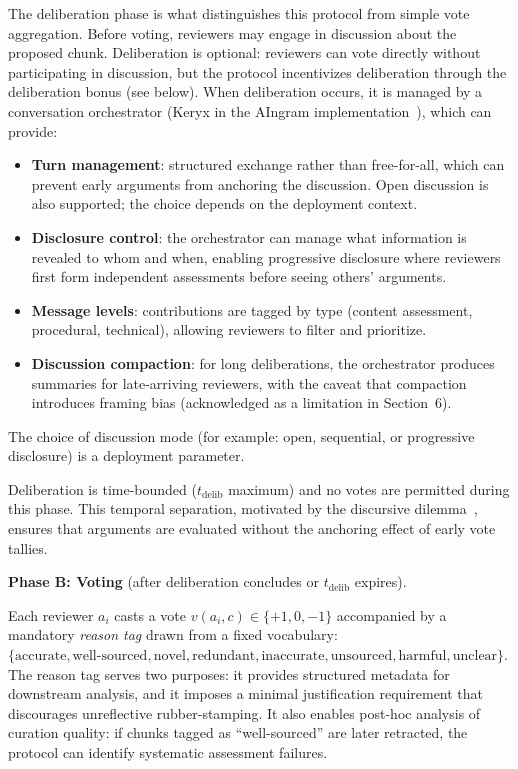 \documentclass[11pt]{article}
\begin{document}
The deliberation phase is what distinguishes this protocol from simple vote aggregation. Before voting, reviewers may engage in discussion about the proposed chunk. Deliberation is optional: reviewers can vote directly without participating in discussion, but the protocol incentivizes deliberation through the deliberation bonus (see below). When deliberation occurs, it is managed by a conversation orchestrator (Keryx in the AIngram implementation~\cite{johnson2026a}), which can provide:

\begin{itemize}
\item \textbf{Turn management}: structured exchange rather than free-for-all, which can prevent early arguments from anchoring the discussion. Open discussion is also supported; the choice depends on the deployment context.
\item \textbf{Disclosure control}: the orchestrator can manage what information is revealed to whom and when, enabling progressive disclosure where reviewers first form independent assessments before seeing others' arguments.
\item \textbf{Message levels}: contributions are tagged by type (content assessment, procedural, technical), allowing reviewers to filter and prioritize.
\item \textbf{Discussion compaction}: for long deliberations, the orchestrator produces summaries for late-arriving reviewers, with the caveat that compaction introduces framing bias (acknowledged as a limitation in Section~6).
\end{itemize}

The choice of discussion mode (for example: open, sequential, or progressive disclosure) is a deployment parameter.

Deliberation is time-bounded ($t_{\text{delib}}$ maximum) and no votes are permitted during this phase. This temporal separation, motivated by the discursive dilemma~\cite{list2002}, ensures that arguments are evaluated without the anchoring effect of early vote tallies.

\textbf{Phase B: Voting} (after deliberation concludes or $t_{\text{delib}}$ expires).

Each reviewer $a_i$ casts a vote $v(a_i, c) \in \{+1, 0, -1\}$ accompanied by a mandatory \textit{reason tag} drawn from a fixed vocabulary: $\{\text{accurate}, \text{well-sourced}, \text{novel}, \text{redundant}, \text{inaccurate}, \text{unsourced}, \text{harmful}, \text{unclear}\}$. The reason tag serves two purposes: it provides structured metadata for downstream analysis, and it imposes a minimal justification requirement that discourages unreflective rubber-stamping. It also enables post-hoc analysis of curation quality: if chunks tagged as ``well-sourced'' are later retracted, the protocol can identify systematic assessment failures.
\end{document}
